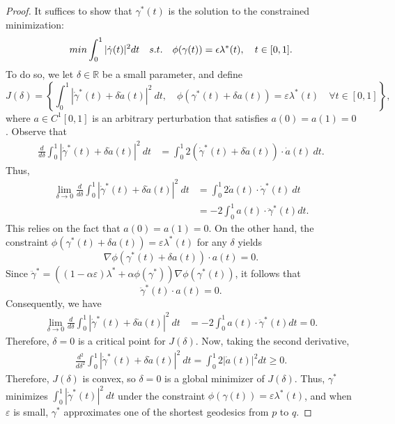 \documentclass[12pt]{amsart}
\theoremstyle{definition}
\theoremstyle{remark}
\numberwithin{equation}{section}
\numberwithin{equation}{section}
\begin{document}
\begin{proof}It suffices to show that $\gamma^*(t)$ is the solution to the constrained minimization:
$$
\\min \int_0^1 |\dot \gamma(t)|^2dt \quad s.t. \quad \phi(\gamma(t))=\epsilon \lambda^*(t), \quad t\in [0, 1]. 
$$
To do so, we 
let $\delta \in \mathbb{R}$ be a small parameter, and define 
\[
J(\delta) = \left\{ \int_0^1|\dot \gamma^*(t)+\delta \dot a(t)|^2~dt, \quad \phi(\gamma^*(t)+\delta a(t))=\varepsilon\lambda^*(t) \quad \forall t \in [0, 1]\right\},
\]
where $a\in C^1[0, 1]$ is an arbitrary perturbation that satisfies $a(0)=a(1)=0$. 
Observe that 
\begin{align*}
   \frac{d}{d\delta} \int_0^1|\dot{\gamma}^*(t)+\delta\dot{a}(t)|^2~dt & 
    = \int_0^1 2( \dot \gamma^*(t) + \delta \dot{a}(t))\cdot\dot{a}(t)~dt. 
   \end{align*}
Thus, 
\begin{align*}
    \lim_{\delta\to 0} \frac{d}{d\delta} \int_0^1|\dot{\gamma}^*(t)+\delta\dot{a}(t)|^2~dt 
    & = \int_0^1 2\dot{a}(t)\cdot \dot{\gamma}^*(t)~dt\\
    & =-2 \int_0^1 a(t)\cdot \ddot \gamma^*(t)dt.
\end{align*}
This relies on the fact that $a(0)=a(1)=0$.  On the other hand, the constraint 
$\phi(\gamma^*(t)+\delta a(t))=\varepsilon \lambda^*(t)$ for any $\delta$ yields 
$$
\nabla \phi(\gamma^*(t)+\delta a(t))\cdot a(t)=0.
$$
Since $\ddot{\gamma}^* = ((1-\alpha\varepsilon)\lambda^*+\alpha\phi(\gamma^*))\nabla\phi(\gamma^*(t))$, it follows that  
\[\ddot{\gamma}^*(t) \cdot a(t) = 0.
\]
Consequently, we have  
\begin{align*}
    \lim_{\delta\to 0} \frac{d}{d\delta} \int_0^1|\dot{\gamma}^*(t)+\delta\dot{a}(t)|^2~dt & 
       =-2 \int_0^1 a(t)\cdot \ddot \gamma^*(t)dt= 0.
\end{align*}
 Therefore, $\delta=0$ is a critical point for $J(\delta)$.
Now, taking the second derivative, 
\begin{align*}
    \frac{d^2}{d\delta^2} \int_0^1|\dot{\gamma}^*(t)+\delta\dot{a}(t)|^2~dt 
     = \int_0^1 2|\dot{a}(t)|^2 dt \geq 0.
\end{align*}
Therefore, $J(\delta)$ is convex, so $\delta=0$ is a global minimizer of $J(\delta)$.  
Thus, $\gamma^*$ minimizes
$\int_0^1|\dot{\gamma}^*(t)|^2~dt$ under the constraint $\phi(\gamma(t)) = \varepsilon\lambda^*(t)$, and when $\varepsilon$ is small, $\gamma^*$ approximates one of the shortest geodesics from $p$ to $q$. 
\end{proof}
\end{document}
